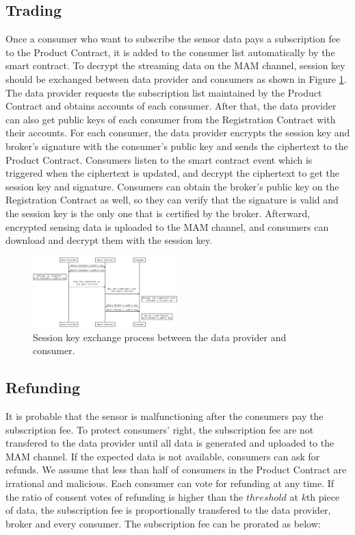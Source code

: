 \documentclass[journal,a4paper]{IEEEtran}
\begin{document}
\subsection{Trading}
Once a consumer who want to subscribe the sensor data pays a subscription fee to the Product Contract, it is added to the consumer list automatically by the smart contract. To decrypt the streaming data on the MAM channel, session key should be exchanged between data provider and consumers as shown in Figure \ref{fig:key_exchange}. The data provider requests the subscription list maintained by the Product Contract and obtains accounts of each consumer. After that, the data provider can also get public keys of each consumer from the Registration Contract with their accounts. For each consumer, the data provider encrypts the session key and broker's signature with the consumer's public key and sends the ciphertext to the Product Contract. Consumers listen to the smart contract event which is triggered when the ciphertext is updated, and decrypt the ciphertext to get the session key and signature. Consumers can obtain the broker's public key on the Registration Contract as well, so they can verify that the signature is valid and the session key is the only one that is certified by the broker. Afterward, encrypted sensing data is uploaded to the MAM channel, and consumers can download and decrypt them with the session key.

\begin{figure}[h]
	\centering
	\includegraphics[width=0.5\textwidth]{key_exchange}
	\caption{Session key exchange process between the data provider and consumer.}
	\label{fig:key_exchange}
\end{figure}

\subsection{Refunding}
It is probable that the sensor is malfunctioning after the consumers pay the subscription fee. To protect consumers' right, the subscription fee are not transfered to the data provider until all data is generated and uploaded to the MAM channel. If the expected data is not available, consumers can ask for refunds. We assume that less than half of consumers in the Product Contract are irrational and malicious. Each consumer can vote for refunding at any time. If the ratio of consent votes of refunding is higher than the $threshold$ at $k$th piece of data, the subscription fee is proportionally transfered to the data provider, broker and every consumer. The subscription fee can be prorated as below:
\end{document}
